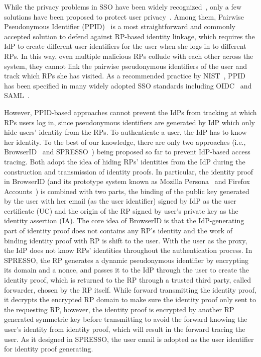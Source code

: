 While the privacy problems in SSO have been widely recognized~\cite{maler2008venn,NIST2017draft}, only a few solutions have been proposed to protect user privacy~\cite{persona,SPRESSO}. Among them, Pairwise Pseudonymous Identifier (PPID)~\cite{OpenIDConnect, SAMLIdentifier} is a most straightforward and commonly accepted solution to defend against RP-based identity linkage, which requires the IdP to create different user identifiers for the user when she logs in to different RPs. In this way, even multiple malicious RPs collude with each other across the system, they cannot link the  pairwise pseudonymous identifiers of the user and track which RPs she has visited. As a recommended practice by NIST~\cite{NIST2017draft}, PPID has been specified in many widely adopted SSO standards including OIDC~\cite{OpenIDConnect} and SAML~\cite{SAMLIdentifier}.

However, PPID-based approaches cannot prevent the IdPs from tracking at which RPs users log in, since pseudonymous identifiers are generated by IdP which only hide users' identity from the RPs. To authenticate a user, the IdP has to know her identity. To the best of our knowledge, there are only two approaches (i.e., BrowserID~\cite{BrowserID} and SPRESSO~\cite{SPRESSO}) being proposed so far to prevent IdP-based access tracing. Both adopt the idea of hiding RPs' identities from the IdP during the construction and transmission of identity proofs. In particular, the identity proof in BrowserID (and its prototype system known as Mozilla Persona~\cite{persona} and Firefox Accounts~\cite{FirefoxAccount}) is combined with two parts, the binding of the public key generated by the user with her email (as the user identifier) signed by IdP as the user certificate (UC) and the origin of the RP signed by user's private key as the identity assertion (IA). The core idea of BrowserID is that the IdP-generating part of identity proof does not contains any RP's identity and the work of binding identity proof with RP is shift to the user. 
With the user as the proxy, the IdP does not know RPs' identities throughout the authentication process. 
In SPRESSO, the RP generates a dynamic pseudonymous identifier by encrypting its domain and a nonce, and passes it to the IdP through the user to create the identity proof, which is returned to the RP through a trusted third party, called forwarder, chosen by the RP itself. While forward transmitting the identity proof, it decrypts the encrypted RP domain to make sure the identity proof only sent to the requesting RP, however, the identity proof is encrypted by another RP generated symmetric key before transmitting to avoid the forward knowing the user's identity from identity proof, which will result in the forward tracing the user. As it designed in SPRESSO, the user email is adopted as the user identifier for identity proof generating. 


